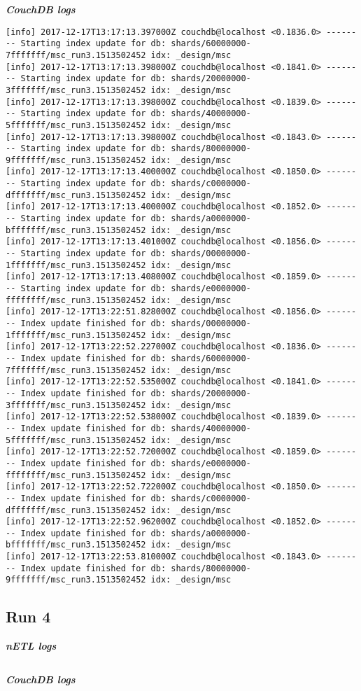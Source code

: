 \textit{\textbf{CouchDB logs}}
\begin{verbatim}
[info] 2017-12-17T13:17:13.397000Z couchdb@localhost <0.1836.0> -------- Starting index update for db: shards/60000000-7fffffff/msc_run3.1513502452 idx: _design/msc
[info] 2017-12-17T13:17:13.398000Z couchdb@localhost <0.1841.0> -------- Starting index update for db: shards/20000000-3fffffff/msc_run3.1513502452 idx: _design/msc
[info] 2017-12-17T13:17:13.398000Z couchdb@localhost <0.1839.0> -------- Starting index update for db: shards/40000000-5fffffff/msc_run3.1513502452 idx: _design/msc
[info] 2017-12-17T13:17:13.398000Z couchdb@localhost <0.1843.0> -------- Starting index update for db: shards/80000000-9fffffff/msc_run3.1513502452 idx: _design/msc
[info] 2017-12-17T13:17:13.400000Z couchdb@localhost <0.1850.0> -------- Starting index update for db: shards/c0000000-dfffffff/msc_run3.1513502452 idx: _design/msc
[info] 2017-12-17T13:17:13.400000Z couchdb@localhost <0.1852.0> -------- Starting index update for db: shards/a0000000-bfffffff/msc_run3.1513502452 idx: _design/msc
[info] 2017-12-17T13:17:13.401000Z couchdb@localhost <0.1856.0> -------- Starting index update for db: shards/00000000-1fffffff/msc_run3.1513502452 idx: _design/msc
[info] 2017-12-17T13:17:13.408000Z couchdb@localhost <0.1859.0> -------- Starting index update for db: shards/e0000000-ffffffff/msc_run3.1513502452 idx: _design/msc
[info] 2017-12-17T13:22:51.828000Z couchdb@localhost <0.1856.0> -------- Index update finished for db: shards/00000000-1fffffff/msc_run3.1513502452 idx: _design/msc
[info] 2017-12-17T13:22:52.227000Z couchdb@localhost <0.1836.0> -------- Index update finished for db: shards/60000000-7fffffff/msc_run3.1513502452 idx: _design/msc
[info] 2017-12-17T13:22:52.535000Z couchdb@localhost <0.1841.0> -------- Index update finished for db: shards/20000000-3fffffff/msc_run3.1513502452 idx: _design/msc
[info] 2017-12-17T13:22:52.538000Z couchdb@localhost <0.1839.0> -------- Index update finished for db: shards/40000000-5fffffff/msc_run3.1513502452 idx: _design/msc
[info] 2017-12-17T13:22:52.720000Z couchdb@localhost <0.1859.0> -------- Index update finished for db: shards/e0000000-ffffffff/msc_run3.1513502452 idx: _design/msc
[info] 2017-12-17T13:22:52.722000Z couchdb@localhost <0.1850.0> -------- Index update finished for db: shards/c0000000-dfffffff/msc_run3.1513502452 idx: _design/msc
[info] 2017-12-17T13:22:52.962000Z couchdb@localhost <0.1852.0> -------- Index update finished for db: shards/a0000000-bfffffff/msc_run3.1513502452 idx: _design/msc
[info] 2017-12-17T13:22:53.810000Z couchdb@localhost <0.1843.0> -------- Index update finished for db: shards/80000000-9fffffff/msc_run3.1513502452 idx: _design/msc
\end{verbatim}


\subsection{Run 4}
\textit{\textbf{nETL logs}}
\begin{verbatim}
\end{verbatim}

\textit{\textbf{CouchDB logs}}
\begin{verbatim}
\end{verbatim}



